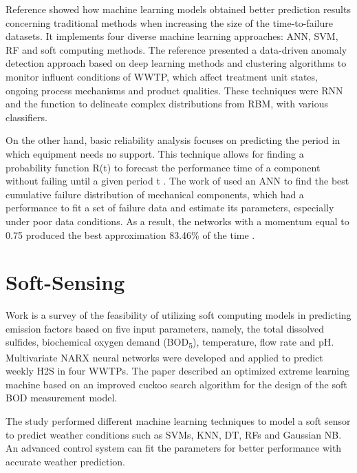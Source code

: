  Reference \cite{Alsina2018} showed how machine learning models obtained better prediction results concerning traditional methods when increasing the size of the time-to-failure datasets. It implements four diverse machine learning approaches: \ac{ANN}, \ac{SVM}, \ac{RF} and soft computing methods. The reference \cite{Dairi2019} presented a data-driven anomaly detection approach based on deep learning methods and clustering algorithms to monitor influent conditions of \ac{WWTP}, which affect treatment unit states, ongoing process mechanisms and product qualities. These techniques were \ac{RNN} and the function to delineate complex distributions from \ac{RBM}, with various classifiers.
 
 On the other hand, basic reliability analysis focuses on predicting the period in which equipment needs no support. This technique allows for finding a probability function R(t) to forecast the performance time of a component without failing until a given period t \cite{Alsina2018}. The work of \cite{Alsina2016} used an \ac{ANN} to find the best cumulative failure distribution of mechanical components, which had a performance to fit a set of failure data and estimate its parameters, especially under poor data conditions. As a result, the networks with a momentum equal to 0.75 produced the best approximation 83.46\% of the time \cite{Alsina2016}.

\section{Soft-Sensing}
\label{s:Related-Works-SoftSensing}

Work \cite{Zounemat-Kermani2019} is a survey of the feasibility of utilizing soft computing models in predicting emission factors based on five input parameters, namely, the total dissolved sulfides, biochemical oxygen demand (\ac{BOD}\textsubscript{5}), temperature, flow rate and pH. Multivariate \ac{NARX} neural networks were developed and applied to predict weekly H2S in four \ac{WWTP}s. The paper \cite{Yu2019} described an optimized extreme learning machine based on an improved cuckoo search algorithm for the design of the soft \ac{BOD} measurement model.

The study \cite{Hernandez-del-Olmo2019} performed different machine learning techniques to model a soft sensor to predict weather conditions such as \ac{SVM}s, \ac{KNN}, \ac{DT}, \ac{RF}s and Gaussian \ac{NB}. An advanced control system can fit the parameters for better performance with accurate weather prediction.

